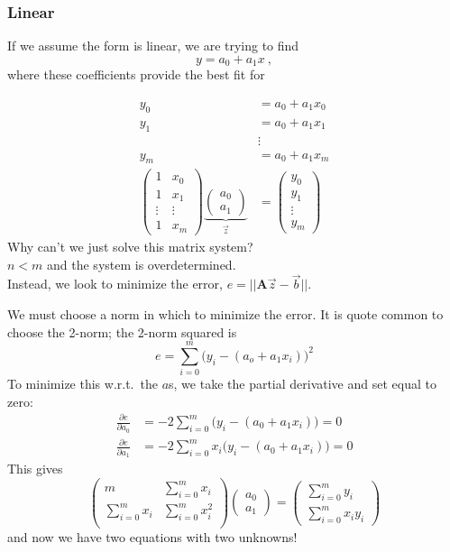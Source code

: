 \documentclass[12pt]{article}
\newcommand{\ve}[1]{\ensuremath{\mathbf{#1}}}
\begin{document}
\subsubsection*{Linear}
If we assume the form is linear, we are trying to find
\[y = a_0 + a_1 x \:,\]
where these coefficients provide the best fit for
 
\begin{align}
y_0 &= a_0 + a_1 x_0 \nonumber \\
y_1 &= a_0 + a_1 x_1 \nonumber\\
& \vdots \nonumber\\
y_m &= a_0 + a_1 x_m \nonumber\\
%
\begin{pmatrix}
1 & x_0 \\ 1 & x_1 \\ \vdots & \vdots \\ 1 & x_m
\end{pmatrix}
\underbrace{\begin{pmatrix}
a_0 \\ a_1
\end{pmatrix}}_{\vec{z}} &=
\begin{pmatrix}
y_0 \\ y_1 \\ \vdots \\ y_m
\end{pmatrix}\nonumber
\end{align}
%
Why can't we just solve this matrix system?\\ $n < m$ and the system is overdetermined.\\ Instead, we look to minimize the error, $e = ||\ve{A}\vec{z} - \vec{b}||$.

We must choose a norm in which to minimize the error. It is quote common to choose the 2-norm; the 2-norm squared is
\[e = \sum_{i=0}^m \bigl(y_i - (a_o + a_1 x_i)\bigr)^2\]
%
To minimize this w.r.t.\ the $a$s, we take the partial derivative and set equal to zero:
%
\begin{align}
\frac{\partial e}{\partial a_0} &= -2 \sum_{i=0}^m \bigl(y_i - (a_0 + a_1 x_i)\bigr) = 0 \nonumber\\
%
\frac{\partial e}{\partial a_1} &= -2 \sum_{i=0}^m x_i \bigl(y_i - (a_0 + a_1 x_i)\bigr) = 0 \nonumber
\end{align}
%
This gives
%
\begin{equation}
\begin{pmatrix}
m                & \sum_{i=0}^m x_i \nonumber\\
\sum_{i=0}^m x_i & \sum_{i=0}^m x_i^2 \nonumber\\ 
\end{pmatrix}
\begin{pmatrix}
a_0 \\ a_1
\end{pmatrix} =
\begin{pmatrix}
\sum_{i=0}^m y_i \\ \sum_{i=0}^m x_i y_i
\end{pmatrix}\nonumber
\end{equation}
%
and now we have two equations with two unknowns! 
\end{document}
